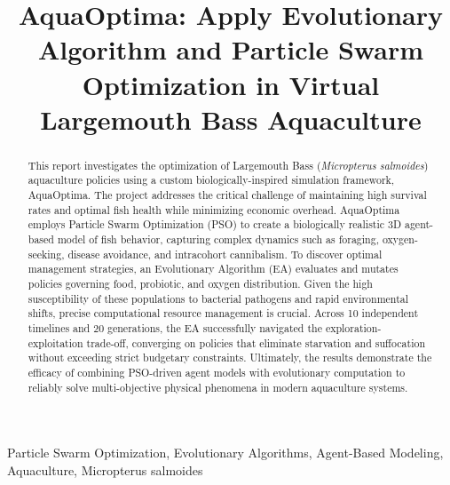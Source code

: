 \documentclass[conference]{IEEEtran}
\begin{document}
\sloppy

\title{AquaOptima: Apply Evolutionary Algorithm and Particle Swarm Optimization in Virtual Largemouth Bass Aquaculture\\}

\author{
\and
{}
}

\maketitle

\begin{abstract}
\normalfont
This report investigates the optimization of Largemouth Bass (\textit{Micropterus salmoides}) aquaculture policies using a custom biologically-inspired simulation framework, AquaOptima. The project addresses the critical challenge of maintaining high survival rates and optimal fish health while minimizing economic overhead. AquaOptima employs Particle Swarm Optimization (PSO) to create a biologically realistic 3D agent-based model of fish behavior, capturing complex dynamics such as foraging, oxygen-seeking, disease avoidance, and intracohort cannibalism. To discover optimal management strategies, an Evolutionary Algorithm (EA) evaluates and mutates policies governing food, probiotic, and oxygen distribution. Given the high susceptibility of these populations to bacterial pathogens and rapid environmental shifts, precise computational resource management is crucial. Across 10 independent timelines and 20 generations, the EA successfully navigated the exploration-exploitation trade-off, converging on policies that eliminate starvation and suffocation without exceeding strict budgetary constraints. Ultimately, the results demonstrate the efficacy of combining PSO-driven agent models with evolutionary computation to reliably solve multi-objective physical phenomena in modern aquaculture systems.
\end{abstract}

\begin{IEEEkeywords}
Particle Swarm Optimization, Evolutionary Algorithms, Agent-Based Modeling, Aquaculture, Micropterus salmoides
\end{IEEEkeywords}
\end{document}
